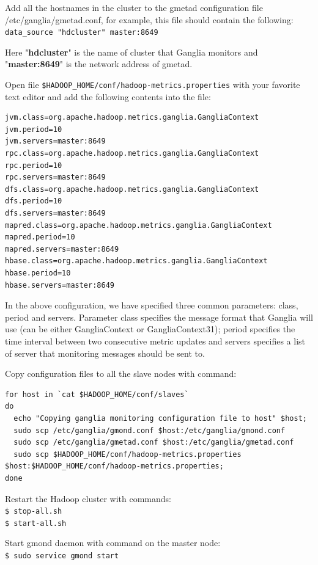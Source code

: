 Add all the hostnames in the cluster to the gmetad configuration file /etc/ganglia/gmetad.conf, for example, this file should contain the following: \\
\verb|data_source "hdcluster" master:8649|

Here "\textbf{hdcluster}" is the name of cluster that Ganglia monitors and "\textbf{master:8649}" is the network address of gmetad.

Open file \verb|$HADOOP_HOME/conf/hadoop-metrics.properties| with your favorite text editor and add the following contents into the file:
\begin{verbatim}
jvm.class=org.apache.hadoop.metrics.ganglia.GangliaContext
jvm.period=10
jvm.servers=master:8649
rpc.class=org.apache.hadoop.metrics.ganglia.GangliaContext
rpc.period=10
rpc.servers=master:8649
dfs.class=org.apache.hadoop.metrics.ganglia.GangliaContext
dfs.period=10
dfs.servers=master:8649
mapred.class=org.apache.hadoop.metrics.ganglia.GangliaContext
mapred.period=10
mapred.servers=master:8649
hbase.class=org.apache.hadoop.metrics.ganglia.GangliaContext
hbase.period=10
hbase.servers=master:8649
\end{verbatim}

In the above configuration, we have specified three common parameters: class, period and servers. Parameter class specifies the message format that Ganglia will use (can be either GangliaContext or GangliaContext31); period specifies the time interval between two consecutive metric updates and servers specifies a list of server that monitoring messages should be sent to.

Copy configuration files to all the slave nodes with command: 
\begin{verbatim}
for host in `cat $HADOOP_HOME/conf/slaves`
do
  echo "Copying ganglia monitoring configuration file to host" $host;
  sudo scp /etc/ganglia/gmond.conf $host:/etc/ganglia/gmond.conf
  sudo scp /etc/ganglia/gmetad.conf $host:/etc/ganglia/gmetad.conf
  sudo scp $HADOOP_HOME/conf/hadoop-metrics.properties $host:$HADOOP_HOME/conf/hadoop-metrics.properties;
done
\end{verbatim}

Restart the Hadoop cluster with commands: \\
\verb|$ stop-all.sh| \\
\verb|$ start-all.sh|

Start gmond daemon with command on the master node: \\
\verb|$ sudo service gmond start|

